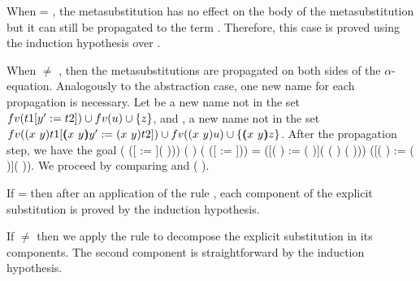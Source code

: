 \begin{coqdoccode}
\end{coqdoccode}
When  = , the metasubstitution has no effect on the body of the metasubstitution but it can still be propagated to the term . Therefore, this case is proved using the induction hypothesis over . 
\begin{coqdoccode}
\end{coqdoccode}
When  \ensuremath{\not=} , then the metasubstitutions are propagated on both sides of the $\alpha$-equation. Analogously to the abstraction case, one new name for each propagation is necessary. Let  be a new name not in the set $fv(t1 [ y' := t2 ])\cup fv(u) \cup \{z\}$, and , a new name not in the set $fv(\esub{\swap{x}{y}{t1}}{\vswap{x}{y}{y'}}{\swap{x}{y}{t2}})\cup fv(\swap{x}{y}{u}) \cup \{\vswap{x}{y}{z}\}$. After the propagation step, we have the goal  (   ([ := ](   ))) (   ) (   ([ := ])) =
   ([(   ) := (   )]( (   )  (   ))) 
    ([(   ) := (   )](   )). We proceed by comparing  and (   ).
\begin{coqdoccode}
\end{coqdoccode}
If  =     then after an application of the rule , each component of the explicit substitution is proved by the induction hypothesis.
\begin{coqdoccode}
\end{coqdoccode}
If  \ensuremath{\not=}     then we apply the rule  to decompose the explicit substitution in its components. The second component is straightforward  by the induction hypothesis.
